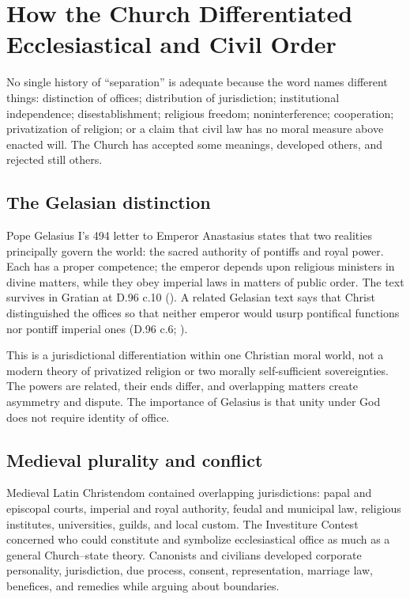 \section{How the Church Differentiated Ecclesiastical and Civil Order}

No single history of ``separation'' is adequate because the word names different things: distinction of offices; distribution of jurisdiction; institutional independence; disestablishment; religious freedom; noninterference; cooperation; privatization of religion; or a claim that civil law has no moral measure above enacted will. The Church has accepted some meanings, developed others, and rejected still others.

\subsection{The Gelasian distinction}

Pope Gelasius I's 494 letter to Emperor Anastasius states that two realities principally govern the world: the sacred authority of pontiffs and royal power. Each has a proper competence; the emperor depends upon religious ministers in divine matters, while they obey imperial laws in matters of public order. The text survives in Gratian at D.96 c.10 (). A related Gelasian text says that Christ distinguished the offices so that neither emperor would usurp pontifical functions nor pontiff imperial ones (D.96 c.6; ).

This is a jurisdictional differentiation within one Christian moral world, not a modern theory of privatized religion or two morally self-sufficient sovereignties. The powers are related, their ends differ, and overlapping matters create asymmetry and dispute. The importance of Gelasius is that unity under God does not require identity of office.

\subsection{Medieval plurality and conflict}

Medieval Latin Christendom contained overlapping jurisdictions: papal and episcopal courts, imperial and royal authority, feudal and municipal law, religious institutes, universities, guilds, and local custom. The Investiture Contest concerned who could constitute and symbolize ecclesiastical office as much as a general Church--state theory. Canonists and civilians developed corporate personality, jurisdiction, due process, consent, representation, marriage law, benefices, and remedies while arguing about boundaries.

